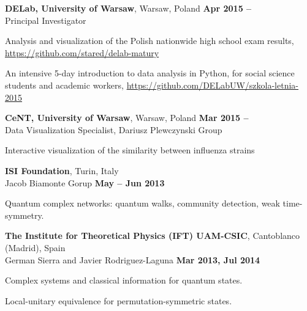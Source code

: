 \documentclass[margin,line]{resume}
\begin{document}
\begin{resume}
    {\bf DELab, University of Warsaw}, Warsaw, Poland \hfill {\bf Apr 2015 --}\\
    Principal Investigator\\
    \begin{list2}
        \vspace*{-4mm}
        \item Analysis and visualization of the Polish nationwide high school exam results, \url{https://github.com/stared/delab-matury} 
        \item An intensive 5-day introduction to data analysis in Python, for social science students and academic workers, \url{https://github.com/DELabUW/szkola-letnia-2015}
    \end{list2}

    {\bf CeNT, University of Warsaw}, Warsaw, Poland \hfill {\bf Mar 2015 --}\\
    Data Visualization Specialist, Dariusz Plewczynski Group\\
    \begin{list2}
        \vspace*{-4mm}
        \item Interactive visualization of the similarity between influenza strains
    \end{list2}

    {\bf  ISI Foundation}, Turin, Italy\\
    Jacob Biamonte Gorup \hfill {\bf May -- Jun 2013}\\
    \begin{list2}
        \vspace*{-4mm}
        \item Quantum complex networks: quantum walks, community detection, weak time-symmetry.
    \end{list2}

    {\bf  The Institute for Theoretical Physics (IFT) UAM-CSIC}, Cantoblanco (Madrid), Spain\\
    German Sierra and Javier Rodriguez-Laguna  \hfill {\bf Mar 2013, Jul 2014}\\
    \begin{list2}
        \vspace*{-4mm}
        \item Complex systems and classical information for quantum states.
        \item Local-unitary equivalence for permutation-symmetric states.
    \end{list2}


\end{resume}
\end{document}
